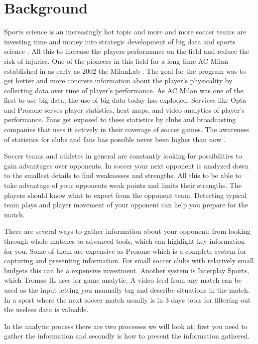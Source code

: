 \section{Background}

Sports science is an increasingly hot topic and more and more soccer teams are investing time and money into strategic development of big data and sports science \cite{bigdata:majorleague}. All this to increase the players performance on the field and reduce the risk of injuries. One of the pioneers in this field for a long time AC Milan established in as early as 2002 the MilanLab \cite{bigdata:milanlab}. The goal for the program was to get better and more concrete information about the player’s physicality by collecting data over time of player’s performance. As AC Milan was one of the first to use big data, the use of big data today has exploded. Services like Opta and Prozone serves player statistics, heat maps, and video analytics of player’s performance. Fans get exposed to these statistics by clubs and broadcasting companies that uses it actively in their coverage of soccer games. The awareness of statistics for clubs and fans has possible never been higher than now \cite{dailymailOnStatistics}.

Soccer teams and athletes in general are constantly looking for possibilities to gain advantages over opponents. In soccer your next opponent is analyzed down to the smallest details to find weaknesses and strengths. All this to be able to take advantage of your opponents weak points and limits their strengths. The players should know what to expect from the opponent team. Detecting typical team plays and player movement of your opponent can help you prepare for the match. 

There are several ways to gather information about your opponent; from looking through whole matches to advanced tools, which can highlight key information for you. Some of them are expensive as Prozone \cite{Prozone:indepth} which is a complete system for capturing and presenting information. For small soccer clubs with relatively small budgets this can be a expensive investment. Another system is Interplay Sports, which Tromsø IL uses for game analytic. A video feed from any match can be used as the input letting you manually tag and describe situations in the match. In a sport where the next soccer match usually is in 3 days tools for filtering out the useless data is valuable.

In the analytic process there are two processes we will look at; first you need to gather the information and secondly is how to present the information gathered. 

